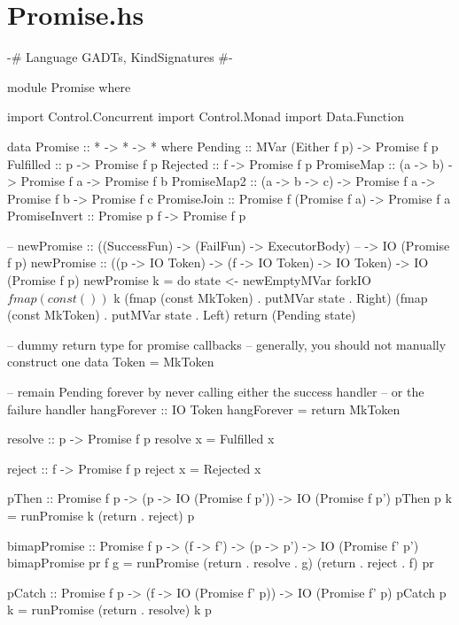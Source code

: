 \documentclass[12pt, english, letterpaper]{kuthesis}
\begin{document}
\section*{Promise.hs}
\begin{code}[samepage=false,numbers=left,frame=leftline]
{-# Language GADTs, KindSignatures #-}

module Promise where

import Control.Concurrent
import Control.Monad
import Data.Function

data Promise :: * -> * -> * where
  Pending :: MVar (Either f p) -> Promise f p
  Fulfilled :: p -> Promise f p
  Rejected :: f -> Promise f p
  PromiseMap :: (a -> b) -> Promise f a -> Promise f b
  PromiseMap2 :: (a -> b -> c) -> Promise f a -> Promise f b
                 -> Promise f c
  PromiseJoin :: Promise f (Promise f a) -> Promise f a
  PromiseInvert :: Promise p f -> Promise f p

-- newPromise :: ((SuccessFun) -> (FailFun) -> ExecutorBody)
--               -> IO (Promise f p)
newPromise :: ((p -> IO Token) -> (f -> IO Token) -> IO Token)
              -> IO (Promise f p)
newPromise k = do
  state <- newEmptyMVar
  forkIO $ fmap (const ()) $ k (fmap (const MkToken)
                                     . putMVar state . Right)
                               (fmap (const MkToken)
                                     . putMVar state . Left)
  return (Pending state)

-- dummy return type for promise callbacks
-- generally, you should not manually construct one
data Token = MkToken

-- remain Pending forever by never calling either the success handler
--   or the failure handler
hangForever :: IO Token
hangForever = return MkToken

resolve :: p -> Promise f p
resolve x = Fulfilled x

reject :: f -> Promise f p
reject x = Rejected x

pThen :: Promise f p
        -> (p -> IO (Promise f p'))
        -> IO (Promise f p')
pThen p k = runPromise k (return . reject) p


bimapPromise :: Promise f p -> (f -> f') -> (p -> p')
                -> IO (Promise f' p')
bimapPromise pr f g = runPromise (return . resolve . g)
                                 (return . reject  . f) pr

pCatch :: Promise f p
        -> (f -> IO (Promise f' p))
        -> IO (Promise f' p)
pCatch p k = runPromise (return . resolve) k p


\end{code}
\end{document}
